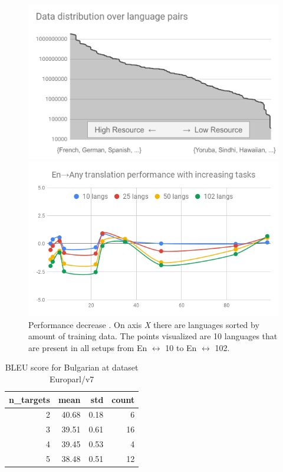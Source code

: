 \begin{figure}[h]
	\begin{minipage}{0.48\textwidth}
	\centering
	\includegraphics[width=0.9\columnwidth]{../img/arivazhagan-2019-data-distribution.png}
	\end{minipage}\hfill
	\begin{minipage}{0.48\textwidth}
	\centering
	\includegraphics[width=0.9\columnwidth]{../img/arivazhagan-2019-diff-per-n-targets.png}
	\end{minipage}
	\caption{
		Performance decrease \citet{arivazhagan-2019-mmnmt-in-the-wild}.
		On axis \emph{X} there are languages sorted by amount of training data.
		The points visualized are 10 languages that are present in all setups
		from En $\leftrightarrow$ 10 to En $\leftrightarrow$ 102.
	}
	\label{fig:arivazhagan-2019-diff-per-n-targets}
\end{figure}

\begin{table}[h]
\centering
\begin{tabular}{rrrr}
\toprule
n\_targets &   mean &   std & count \\
\midrule
         2 &  40.68 &  0.18 &   6 \\
         3 &  39.51 &  0.61 &  16 \\
         4 &  39.45 &  0.53 &   4 \\
         5 &  38.48 &  0.51 &  12 \\
\bottomrule
\end{tabular}

\caption{BLEU score for Bulgarian at dataset Europarl/v7 }
\label{tab:bg/Europarl/v7 }
\end{table}


